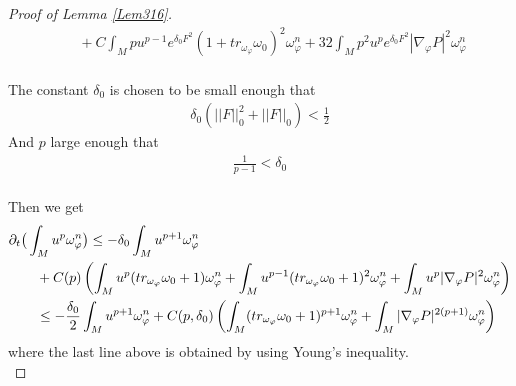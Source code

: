 \documentclass[11pt]{amsart}
\numberwithin{equation}{section}
\begin{document}
\begin{proof}[Proof of Lemma \ref{Lem316}]
\begin{align}
	 &\quad + C\int_M pu^{p-1}e^{\delta_0 F^2}(1+tr_{\omega_{\varphi}}\omega_0)^2\omega_{\varphi}^n + 32\int_M p^2u^pe^{\delta_0F^2} |\nabla_\varphi P|^2 \omega_\varphi^n 
\end{align}\\
The constant $\delta_0$ is chosen to be small enough that 
\begin{align}
	\delta_0 (||F||_0^2+||F||_0)<\frac{1}{2}
\end{align}
And $p$ large enough that 
\begin{align}
	\frac{1}{p-1} < \delta_0
\end{align}\\
Then we get
\begin{align}
	&\partial_t\big( \int_M u^p\omega_\varphi^n\big)\le  -\delta_0 \int_M u^{p+1}\omega_\varphi^n \notag\\
	 &\quad\quad + C(p)\left( \int_M u^p (tr_{\omega_{\varphi}}\omega_0+1)\omega_\varphi^n + \int_M u^{p-1} (tr_{\omega_{\varphi}}\omega_0+1)^2 \omega_\varphi^n + \int_M u^{p}|\nabla_\varphi P|^2 \omega_\varphi^n \right) \notag\\
	&\quad\quad \le  -\frac{\delta_0}{2} \int_M u^{p+1}\omega_\varphi^n + C(p,\delta_0 )\left( \int_M (tr_{\omega_{\varphi}}\omega_0+1)^{p+1} \omega_\varphi^n + \int_M |\nabla_\varphi P|^{2(p+1)} \omega_\varphi^n \right)
\end{align}
where the last line above is obtained by using Young's inequality. \\


\end{proof}
\end{document}
